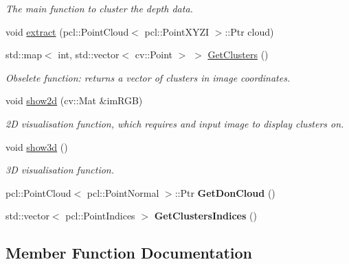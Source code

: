 \begin{DoxyCompactItemize}
\begin{DoxyCompactList}\small\item\em The main function to cluster the depth data. \end{DoxyCompactList}\item 
void \hyperlink{classDoN_ad64458603d62f8a04298520cb747b90e}{extract} (pcl\+::\+Point\+Cloud$<$ pcl\+::\+Point\+X\+Y\+ZI $>$\+::Ptr cloud)
\item 
\mbox{\label{classDoN_aa0cffa1275c78488726dab2635265c05}} 
std\+::map$<$ int, std\+::vector$<$ cv\+::\+Point $>$ $>$ \hyperlink{classDoN_aa0cffa1275c78488726dab2635265c05}{Get\+Clusters} ()
\begin{DoxyCompactList}\small\item\em Obselete function\+: returns a vector of clusters in image coordinates. \end{DoxyCompactList}\item 
\mbox{\label{classDoN_a32f62241f82a021cbf44cefaee8f800d}} 
void \hyperlink{classDoN_a32f62241f82a021cbf44cefaee8f800d}{show2d} (cv\+::\+Mat \&im\+R\+GB)
\begin{DoxyCompactList}\small\item\em 2D visualisation function, which requires and input image to display clusters on. \end{DoxyCompactList}\item 
\mbox{\label{classDoN_a1d5a069af68c05bc2b525d42b8b9e94a}} 
void \hyperlink{classDoN_a1d5a069af68c05bc2b525d42b8b9e94a}{show3d} ()
\begin{DoxyCompactList}\small\item\em 3D visualisation function. \end{DoxyCompactList}\item 
\mbox{\label{classDoN_a704e464039afd6d573c11ca57fc800be}} 
pcl\+::\+Point\+Cloud$<$ pcl\+::\+Point\+Normal $>$\+::Ptr {\bfseries Get\+Don\+Cloud} ()
\item 
\mbox{\label{classDoN_a79aa2357440c81f36cf99902cf24e47e}} 
std\+::vector$<$ pcl\+::\+Point\+Indices $>$ {\bfseries Get\+Clusters\+Indices} ()
\end{DoxyCompactItemize}


\subsection{Member Function Documentation}
\mbox{\label{classDoN_ae1e63b9178dad44c2ced58bd571253cd}} 
